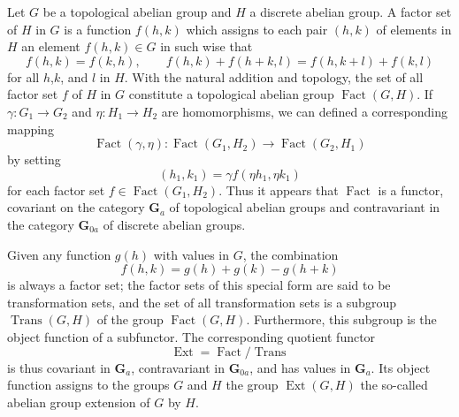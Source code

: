 \documentclass[11pt,a4paper]{report}
\DeclareMathOperator{\fc}{Fact}
\DeclareMathOperator{\tra}{Trans}
\DeclareMathOperator{\ex}{Ext}
\begin{document}
Let $G$ be a topological abelian group and $H$ a discrete abelian group. A factor set of $H$ in $G$ is a function
$f(h,k)$ which assigns to each pair $(h,k)$ of elements in $H$ an element $f(h,k)\in G$ in such wise that
\begin{equation*}
	f(h,k)=f(k,h),\qquad f(h,k)+f(h+k,l)=f(h,k+l)+f(k,l)
\end{equation*}
for all $h$,$k$, and $l$ in $H$. With the natural addition and topology, the set of all factor set $f$ of $H$
in $G$ constitute a topological abelian group $\fc(G,H)$. If $\gamma:G_1\rightarrow G_2$ and $\eta:H_1\rightarrow H_2$
are homomorphisms, we can defined a corresponding mapping
\begin{equation*}
	\fc(\gamma,\eta):\fc(G_1,H_2)\rightarrow\fc(G_2,H_1)
\end{equation*}
by setting
\begin{equation*}
	[\fc(\gamma,\eta)f](h_1,k_1)= \gamma f(\eta h_1,\eta k_1)
\end{equation*}
for each factor set $f\in\fc(G_1,H_2)$. Thus it appears that $\fc$ is a functor, covariant on the
category $\mathbf{G}_a$ of topological abelian groups and contravariant in the category $\mathbf{G}_{0a}$
of discrete abelian groups.

Given any function $g(h)$ with values in $G$, the combination
\begin{equation*}
	f(h,k)= g(h)+g(k)-g(h+k)
\end{equation*}
is always a factor set; the factor sets of this special form are said to be transformation sets,
and the set of all transformation sets is a subgroup $\tra(G,H)$ of the group $\fc(G,H)$.
Furthermore, this subgroup is the object function of a subfunctor. The corresponding quotient
functor
\begin{equation*}
	\ex=\fc/\tra
\end{equation*}
is thus covariant in $\mathbf{G}_a$, contravariant in $\mathbf{G}_{0a}$, and has values in $\mathbf{G}_a$.
Its object function assigns to the groups $G$ and $H$ the group $\ex(G,H)$ the so\hyp{}called abelian
group extension of $G$ by $H$.
\end{document}
